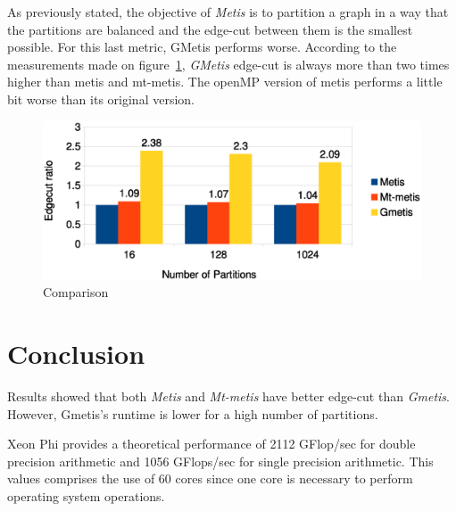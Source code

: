 \documentclass[abstract=on,9pt,twocolumn]{scrartcl}
\begin{document}
As previously stated, the objective of \textit{Metis} is to partition a graph in a way
that the partitions are balanced and the edge-cut between them is the smallest
possible. For this last metric, GMetis performs worse. According to the
measurements made on figure~\ref{img:edgecut}, \textit{GMetis} edge-cut is
always more than two times higher than metis and mt-metis. The openMP
version of metis performs a little bit worse than its original version.

\begin{center}
\begin{figure}[htb]
    \includegraphics[width=\columnwidth]{img/edgecut.eps}
    \caption{Comparison}
    \label{img:edgecut}
\end{figure}
\end{center}



\section{Conclusion}
\label{sec:conc}
Results showed that both \textit{Metis} and \textit{Mt-metis} have
better edge-cut than \textit{Gmetis}. However, Gmetis's runtime is lower
for a high number of partitions.


Xeon Phi provides a theoretical performance of 2112 GFlop/sec for double
precision arithmetic and 1056 GFlops/sec for single precision
arithmetic. This values comprises the use of 60 cores since one core is
necessary to perform operating system operations.





\end{document}
